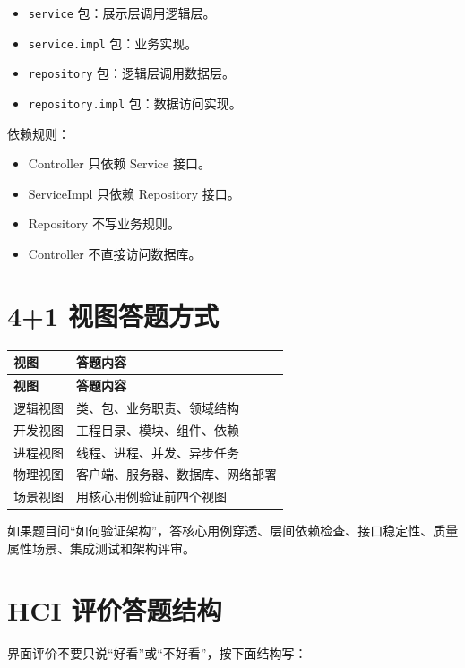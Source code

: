 \documentclass[UTF8,zihao=-4]{ctexart}
\begin{document}
\begin{itemize}
\item \texttt{service} 包：展示层调用逻辑层。
\item \texttt{service.impl} 包：业务实现。
\item \texttt{repository} 包：逻辑层调用数据层。
\item \texttt{repository.impl} 包：数据访问实现。
\end{itemize}

依赖规则：

\begin{itemize}
\item Controller 只依赖 Service 接口。
\item ServiceImpl 只依赖 Repository 接口。
\item Repository 不写业务规则。
\item Controller 不直接访问数据库。
\end{itemize}

\section{4+1 视图答题方式}

{
\footnotesize
\begin{longtable}{|>{\raggedright\arraybackslash}p{}|>{\raggedright\arraybackslash}p{}|}
\hline
\textbf{视图} & \textbf{答题内容} \\
\hline
\endfirsthead
\hline
\textbf{视图} & \textbf{答题内容} \\
\hline
\endhead
逻辑视图 & 类、包、业务职责、领域结构 \\
\hline
开发视图 & 工程目录、模块、组件、依赖 \\
\hline
进程视图 & 线程、进程、并发、异步任务 \\
\hline
物理视图 & 客户端、服务器、数据库、网络部署 \\
\hline
场景视图 & 用核心用例验证前四个视图 \\
\hline
\end{longtable}
}


如果题目问“如何验证架构”，答核心用例穿透、层间依赖检查、接口稳定性、质量属性场景、集成测试和架构评审。

\section{HCI 评价答题结构}

界面评价不要只说“好看”或“不好看”，按下面结构写：
\end{document}
